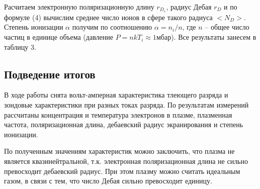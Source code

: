 \documentclass[12pt,a4paper]{article}
\begin{document}
Расчитаем электронную поляризационную длину $r_{D_e}$, радиус Дебая $r_{D}$ и по формуле (4)  вычислим среднее число ионов в сфере такого радиуса $<N_D>$.
Степень ионизации $\alpha$ получим по соотношению $\alpha = n_i/n$, где $n$ -- общее число частиц в единице объема (давление $P=nkT_i\approx 1$мбар). 
Все результаты занесем в таблицу 3.
\begin{table}[H]
    \centering
    \caption{Вычисленные характеристики}
\end{table}

\subsection*{Подведение итогов}
В ходе работы снята вольт-амперная характеристика тлеющего разряда и зондовые характеристики при разных токах разряда.
По результатам измерений рассчитаны концентрация и температура электронов в плазме, плазменная частота, поляризационная длина, дебаевский радиус экранирования и степень ионизации.

По полученным значениям характеристик можно заключить, что плазма не является квазинейтральной, т.к. электронная поляризационная длина не сильно превосходит дебаевский радиус.
При этом плазму можно считать идеальным газом, в связи с тем, что число Дебая сильно превосходит единицу.
\end{document}
